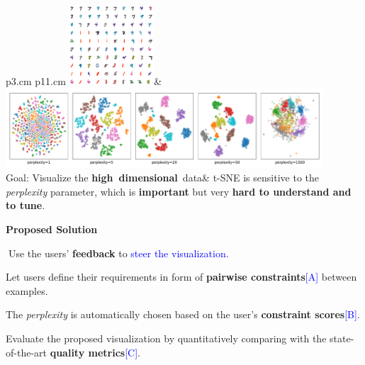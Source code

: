 \documentclass[portrait,final,a0paper]{nadiposter}
\newcommand{\compresslist}{%
\setlength{\itemsep}{1pt}%
\setlength{\parskip}{0pt}%
\setlength{\parsep}{0pt}%
\setlength{\leftmargin}{0pt}%
}
\begin{document}
\begin{poster}
{\begin{minipage}{0.63\linewidth}
    \begin{tabular}{p{3.cm} p{11.cm}}
        \includegraphics[height=8em]{images/mnist_raw200.pdf}&
        \includegraphics[height=8em]{images/MNIST-SMALL_examples.pdf}\\
        Goal: Visualize the \scriptsize{\textbf{high~dimensional}~data}&
        t-SNE is sensitive to the \emph{perplexity} parameter, which is \textbf{important} but very \textbf{hard to understand and to tune}.\\
    \end{tabular}
\end{minipage}
\begin{minipage}{0.33\linewidth}
    \begin{center} \Large{\textbf{Proposed Solution}}\end{center}
    $\;$Use the users' \textbf{feedback} to \textcolor{blue}{steer the visualization}.
    
    \begin{itemize}
        \compresslist{
            \item Let users define their requirements in form of \textbf{pairwise constraints}\textcolor{blue}{[A]} between examples.
            \item The \emph{perplexity} is automatically chosen based on the user's \textbf{constraint scores}\textcolor{blue}{[B]}.
            \item Evaluate the proposed visualization by quantitatively comparing with the state-of-the-art \textbf{quality metrics}\textcolor{blue}{[C]}.
        }
    \end{itemize}
\end{minipage}
}

\end{poster}
\end{document}
